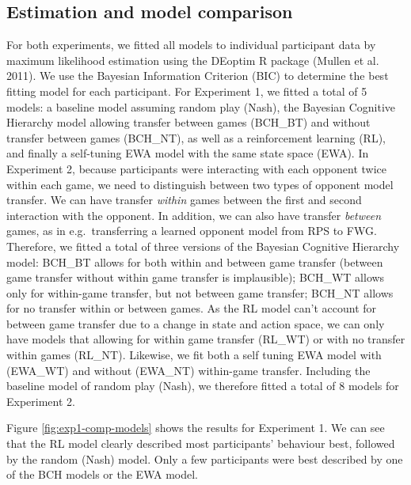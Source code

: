 \documentclass[smallextended]{svjour3}       %
\begin{document}
\hypertarget{estimation-and-model-comparison}{%
\subsection{Estimation and model
comparison}\label{estimation-and-model-comparison}}

For both experiments, we fitted all models to individual participant
data by maximum likelihood estimation using the DEoptim R package
(Mullen et al. 2011). We use the Bayesian Information Criterion (BIC) to
determine the best fitting model for each participant. For Experiment 1,
we fitted a total of 5 models: a baseline model assuming random play
(Nash), the Bayesian Cognitive Hierarchy model allowing transfer between
games (BCH\_BT) and without transfer between games (BCH\_NT), as well as
a reinforcement learning (RL), and finally a self-tuning EWA model with
the same state space (EWA). In Experiment 2, because participants were
interacting with each opponent twice within each game, we need to
distinguish between two types of opponent model transfer. We can have
transfer \emph{within} games between the first and second interaction
with the opponent. In addition, we can also have transfer \emph{between}
games, as in e.g.~transferring a learned opponent model from RPS to FWG.
Therefore, we fitted a total of three versions of the Bayesian Cognitive
Hierarchy model: BCH\_BT allows for both within and between game
transfer (between game transfer without within game transfer is
implausible); BCH\_WT allows only for within-game transfer, but not
between game transfer; BCH\_NT allows for no transfer within or between
games. As the RL model can't account for between game transfer due to a
change in state and action space, we can only have models that allowing
for within game transfer (RL\_WT) or with no transfer within games
(RL\_NT). Likewise, we fit both a self tuning EWA model with (EWA\_WT)
and without (EWA\_NT) within-game transfer. Including the baseline model
of random play (Nash), we therefore fitted a total of 8 models for
Experiment 2.

Figure \ref{fig:exp1-comp-models} shows the results for Experiment 1. We
can see that the RL model clearly described most participants' behaviour
best, followed by the random (Nash) model. Only a few participants were
best described by one of the BCH models or the EWA model.
\end{document}
